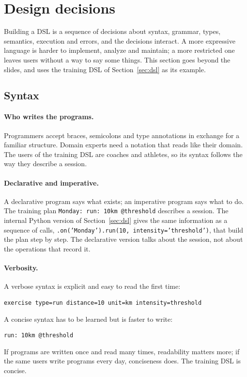 \section{Design decisions}
\label{sec:design}

Building a DSL is a sequence of decisions about syntax, grammar, types,
semantics, execution and errors, and the decisions interact. A more
expressive language is harder to implement, analyze and maintain; a more
restricted one leaves users without a way to say some things. This section
goes beyond the slides, and uses the training DSL of
Section~\ref{sec:dsl} as its example.

\subsection{Syntax}

\paragraph{Who writes the programs.} Programmers accept braces, semicolons and
type annotations in exchange for a familiar structure. Domain experts need a
notation that reads like their domain. The users of the training DSL are
coaches and athletes, so its syntax follows the way they describe a session.

\paragraph{Declarative and imperative.} A declarative program says what
exists; an imperative program says what to do. The training plan
\texttt{Monday: run: 10km @threshold} describes a session. The internal Python
version of Section~\ref{sec:dsl} gives the same information as a sequence of
calls, \texttt{.on('Monday').run(10, intensity='threshold')}, that build the
plan step by step. The declarative version talks about the session, not about
the operations that record it.

\paragraph{Verbosity.} A verbose syntax is explicit and easy to read the first
time:
\begin{lstlisting}
exercise type=run distance=10 unit=km intensity=threshold
\end{lstlisting}
A concise syntax has to be learned but is faster to write:
\begin{lstlisting}
run: 10km @threshold
\end{lstlisting}
If programs are written once and read many times, readability matters more;
if the same users write programs every day, conciseness does. The training
DSL is concise.

